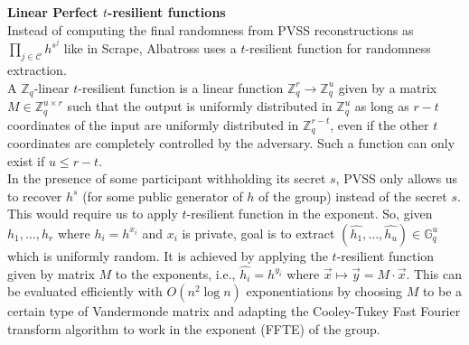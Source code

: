 \documentclass[letterpaper,twocolumn,10pt]{article}
\theoremstyle{definition}
\theoremstyle{remark}
\begin{document}
\noindent\textbf{Linear Perfect $t$-resilient functions}\\
Instead of computing the final randomness from PVSS reconstructions as $\prod_{j \in \mathcal{C}} h^{s^j}$ like in Scrape, Albatross uses a $t$-resilient function for randomness extraction.\\
A $\mathbb{Z}_q$-linear $t$-resilient function is a linear function $\mathbb{Z}_q^r \rightarrow \mathbb{Z}_q^u$ given by a matrix $M \in \mathbb{Z}_q^{u \times r}$ such that the output is uniformly distributed in  $\mathbb{Z}_q^u$ as long as $r-t$ coordinates of the input are uniformly distributed in  $\mathbb{Z}_q^{r-t}$, even if the other $t$ coordinates are completely controlled by the adversary. Such a function can only exist if $u \le r-t$.\\
In the presence of some participant withholding its secret $s$, PVSS only allows us to recover $h^s$ (for some public generator of $h$ of the group) instead of the secret $s$. This would require us to apply $t$-resilient function in the exponent. So, given $h_1, \ldots, h_r$ where $h_i = h^{x_i}$ and $x_i$ is private,  goal is to extract $(\hat{h_1},\ldots, \hat{h_u}) \in \mathbb{G}_q^u$ which is uniformly random. It is achieved by applying the $t$-resilient function given by matrix $M$ to the exponents, i.e., $\hat{h_i} = h^{y_i}$ where $\vec{x} \mapsto \vec{y} = M \cdot \vec{x}$. This can be evaluated efficiently with $O(n^2 \log n)$ exponentiations by choosing $M$ to be a certain type of Vandermonde matrix and adapting the Cooley-Tukey Fast Fourier transform algorithm to work in the exponent (FFTE) \cite{cascudo2020albatross} of the group.\\
\end{document}
